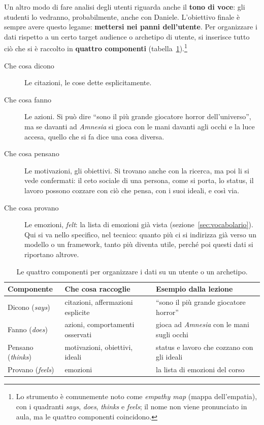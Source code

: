 Un altro modo di fare analisi degli utenti riguarda anche il \textbf{tono di
voce}: gli studenti lo vedranno, probabilmente, anche con Daniele. L'obiettivo
finale è sempre avere questo legame: \textbf{mettersi nei panni dell'utente}.
Per organizzare i dati rispetto a un certo target audience o archetipo di
utente, si inserisce tutto ciò che si è raccolto in \textbf{quattro
componenti} (tabella~\ref{tab:empatia}).\footnote{Lo strumento è comunemente
noto come \emph{empathy map} (mappa dell'empatia), con i quadranti
\emph{says}, \emph{does}, \emph{thinks} e \emph{feels}; il nome non viene
pronunciato in aula, ma le quattro componenti coincidono.}
\begin{description}
  \item[Che cosa dicono] Le citazioni, le cose dette esplicitamente.
  \item[Che cosa fanno] Le azioni. Si può dire ``sono il più grande giocatore
        horror dell'universo'', ma se davanti ad \emph{Amnesia} si gioca con
        le mani davanti agli occhi e la luce accesa, quello che si fa dice
        una cosa diversa.
  \item[Che cosa pensano] Le motivazioni, gli obiettivi. Si trovano anche con
        la ricerca, ma poi li si vede confermati: il ceto sociale di una
        persona, come si porta, lo status, il lavoro possono cozzare con ciò
        che pensa, con i suoi ideali, e così via.
  \item[Che cosa provano] Le emozioni, \emph{felt}: la lista di emozioni già
        vista (sezione~\ref{sec:vocabolario}). Qui si va nello specifico, nel
        tecnico: quanto più ci si indirizza già verso un modello o un
        framework, tanto più diventa utile, perché poi questi dati si
        riportano altrove.
\end{description}

\begin{table}[htbp]
  \centering
  \caption{Le quattro componenti per organizzare i dati su un utente o un
  archetipo.}
  \label{tab:empatia}
  \begin{tabular}{@{}p{}p{}p{}@{}}
    \toprule
    \textbf{Componente} & \textbf{Che cosa raccoglie} & \textbf{Esempio dalla lezione} \\
    \midrule
    Dicono (\emph{says}) & citazioni, affermazioni esplicite & ``sono il più grande giocatore horror'' \\
    Fanno (\emph{does}) & azioni, comportamenti osservati & gioca ad \emph{Amnesia} con le mani sugli occhi \\
    Pensano (\emph{thinks}) & motivazioni, obiettivi, ideali & status e lavoro che cozzano con gli ideali \\
    Provano (\emph{feels}) & emozioni & la lista di emozioni del corso \\
    \bottomrule
  \end{tabular}
\end{table}

